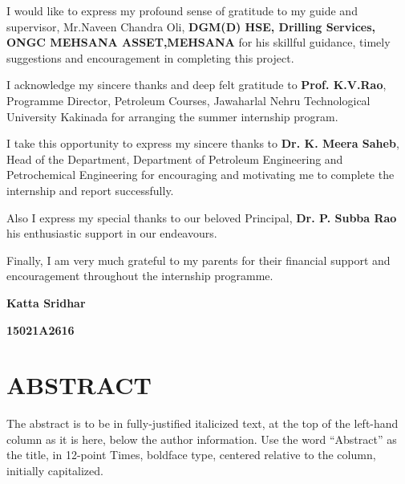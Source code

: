 \documentclass[11pt,a4paper]{report}
\begin{document}
I would like to express my profound sense of gratitude to my guide and supervisor, Mr.Naveen Chandra Oli, \textbf{DGM(D) HSE, Drilling Services, ONGC MEHSANA ASSET,MEHSANA} for his skillful guidance, timely suggestions and encouragement in completing this project.

\vspace{1em}


I acknowledge my sincere thanks and deep felt gratitude to \textbf{Prof. K.V.Rao}, Programme Director, Petroleum Courses, Jawaharlal Nehru Technological University Kakinada for arranging the summer internship program.

\vspace{1em}

I take this opportunity to express my sincere thanks to \textbf{Dr. K. Meera Saheb}, Head of the Department, Department of Petroleum Engineering and Petrochemical Engineering for encouraging and motivating me to complete the internship and report successfully.

\vspace{1em}

Also I express my special thanks to our beloved Principal, \textbf{Dr. P. Subba Rao} his enthusiastic support in our endeavours.

\vspace{1em}

Finally, I am very much grateful to my parents for their financial support and encouragement throughout the internship programme.

\vspace{1em}

\hfill \textbf{Katta Sridhar}

\hfill \textbf{15021A2616} \hspace{0.005\textwidth}

\newpage

\tableofcontents


\newpage

\section*{\centering ABSTRACT}


The abstract is to be in fully-justified italicized text, at the top of the left-hand column as it is here,
below the author information. Use the word “Abstract” as the title, in 12-point Times,
 boldface type, centered relative to the column, initially capitalized.
\end{document}
